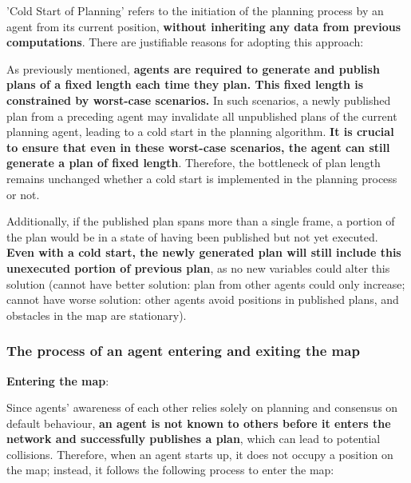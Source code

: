 'Cold Start of Planning' refers to the initiation of the planning process by an agent from its current position, \textbf{without inheriting any data from previous computations}. There are justifiable reasons for adopting this approach:

As previously mentioned, \textbf{agents are required to generate and publish plans of a fixed length each time they plan.
This fixed length is constrained by worst-case scenarios.} In such scenarios, a newly published plan from a preceding agent may invalidate all unpublished plans of the current planning agent, leading to a cold start in the planning algorithm.
\textbf{It is crucial to ensure that even in these worst-case scenarios, the agent can still generate a plan of fixed length}. Therefore, the bottleneck of plan length remains unchanged whether a cold start is implemented in the planning process or not.

Additionally, if the published plan spans more than a single frame, a portion of the plan would be in a state of having been published but not yet executed. \textbf{Even with a cold start, the newly generated plan will still include this unexecuted portion of previous plan}, as no new variables could alter this solution (cannot have better solution: plan from other agents could only increase; cannot have worse solution: other agents avoid positions in published plans, and obstacles in the map are stationary).


\subsubsection{The process of an agent entering and exiting the map}
\label{chap:behaviour}
\label{chap:join map}

\textbf{Entering the map}: 

Since agents' awareness of each other relies solely on planning and consensus on default behaviour, \textbf{an agent is not known to others before it enters the network and successfully publishes a plan}, which can lead to potential collisions. Therefore, when an agent starts up, it does not occupy a position on the map; instead, it follows the following process to enter the map:


